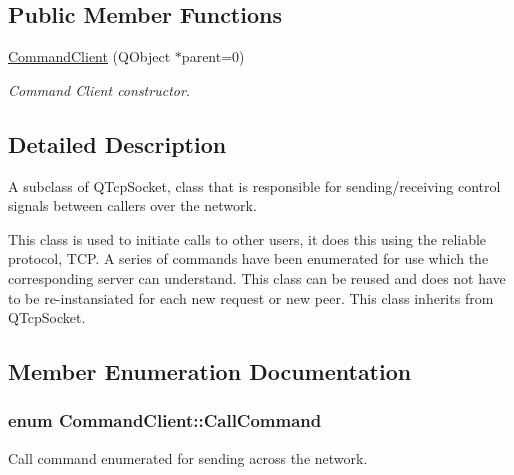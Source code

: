 \subsection*{\-Public \-Member \-Functions}
\begin{DoxyCompactItemize}
\item 
\hyperlink{class_command_client_a14a6d40dd5e192c96b15e65ca3d668b4}{\-Command\-Client} (\-Q\-Object $\ast$parent=0)
\begin{DoxyCompactList}\small\item\em \-Command \-Client constructor. \end{DoxyCompactList}\end{DoxyCompactItemize}


\subsection{\-Detailed \-Description}
\-A subclass of \-Q\-Tcp\-Socket, class that is responsible for sending/receiving control signals between callers over the network. 

\-This class is used to initiate calls to other users, it does this using the reliable protocol, \-T\-C\-P. \-A series of commands have been enumerated for use which the corresponding server can understand. \-This class can be reused and does not have to be re-\/instansiated for each new request or new peer. \-This class inherits from \-Q\-Tcp\-Socket. 

\subsection{\-Member \-Enumeration \-Documentation}
\hypertarget{class_command_client_aa99b17193724fef8aed2b2c724b0c243}{
\subsubsection[{\-Call\-Command}]{\setlength{\rightskip}{0pt plus 5cm}enum {\bf \-Command\-Client\-::\-Call\-Command}}}
\label{class_command_client_aa99b17193724fef8aed2b2c724b0c243}


\-Call command enumerated for sending across the network. 

